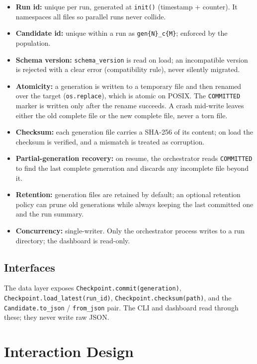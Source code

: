 \documentclass[12pt,a4paper]{article}
\begin{document}
\begin{itemize}[noitemsep]
  \item \textbf{Run id:} unique per run, generated at \texttt{init()} (timestamp + counter). It namespaces all files so parallel runs never collide.
  \item \textbf{Candidate id:} unique within a run as \texttt{gen\{N\}\_c\{M\}}; enforced by the population.
  \item \textbf{Schema version:} \texttt{schema\_version} is read on load; an incompatible version is rejected with a clear error (compatibility rule), never silently migrated.
  \item \textbf{Atomicity:} a generation is written to a temporary file and then renamed over the target (\texttt{os.replace}), which is atomic on POSIX. The \texttt{COMMITTED} marker is written only after the rename succeeds. A crash mid-write leaves either the old complete file or the new complete file, never a torn file.
  \item \textbf{Checksum:} each generation file carries a SHA-256 of its content; on load the checksum is verified, and a mismatch is treated as corruption.
  \item \textbf{Partial-generation recovery:} on resume, the orchestrator reads \texttt{COMMITTED} to find the last complete generation and discards any incomplete file beyond it.
  \item \textbf{Retention:} generation files are retained by default; an optional retention policy can prune old generations while always keeping the last committed one and the run summary.
  \item \textbf{Concurrency:} single-writer. Only the orchestrator process writes to a run directory; the dashboard is read-only.
\end{itemize}

\subsection{Interfaces}

The data layer exposes \texttt{Checkpoint.commit(generation)}, \texttt{Checkpoint.load\_latest(run\_id)}, \texttt{Checkpoint.checksum(path)}, and the \texttt{Candidate.to\_json} / \texttt{from\_json} pair. The CLI and dashboard read through these; they never write raw JSON.

\section{Interaction Design}
\end{document}
